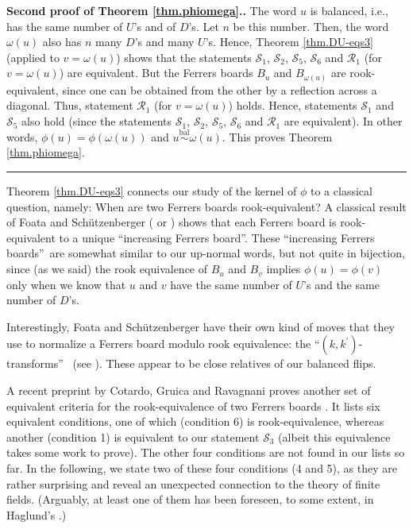 \documentclass[numbers=enddot,12pt,final,onecolumn,notitlepage]{scrartcl}%
\theoremstyle{definition}
\newenvironment{proof}[1][Proof]{\noindent\textbf{#1.} }{\ \rule{0.5em}{0.5em}}
\newcommand{\balsim}{\overset{\operatorname*{bal}}{\sim}}
\newenvironment{noncompile}{}{}
\begin{document}
\begin{noncompile}
\begin{proof}[Second proof of Theorem \ref{thm.phiomega}.]
The word $u$ is balanced, i.e., has the same number of $U$'s and of $D$'s. Let
$n$ be this number. Then, the word $\omega\left(  u\right)  $ also has $n$
many $D$'s and many $U$'s. Hence, Theorem \ref{thm.DU-eqs3} (applied to
$v=\omega\left(  u\right)  $) shows that the statements $\mathcal{S}_{1}$,
$\mathcal{S}_{2}$, $\mathcal{S}_{5}$, $\mathcal{S}_6$ and $\mathcal{R}_1$ (for $v=\omega
\left(  u\right)  $) are equivalent. But the Ferrers boards $B_{u}$ and
$B_{\omega\left(  u\right)  }$ are rook-equivalent, since one can be obtained
from the other by a reflection across a diagonal. Thus, statement
$\mathcal{R}_1$ (for $v=\omega\left(  u\right)  $) holds. Hence, statements
$\mathcal{S}_{1}$ and $\mathcal{S}_{5}$ also hold (since the statements
$\mathcal{S}_{1}$, $\mathcal{S}_{2}$, $\mathcal{S}_{5}$, $\mathcal{S}_6$ and $\mathcal{R}_1$
are equivalent). In other words, $\phi\left(  u\right)  =\phi\left(
\omega\left(  u\right)  \right)  $ and $u \balsim \omega\left(  u\right)  $. This proves Theorem \ref{thm.phiomega}.
\end{proof}
\end{noncompile}

Theorem \ref{thm.DU-eqs3} connects our study of the kernel of $\phi$ to a
classical question, namely: When are two Ferrers boards rook-equivalent? A
classical result of Foata and Sch\"{u}tzenberger (\cite[Theorem 6]{FoaSch70}
or \cite[Theorem 7]{BCHR11}) shows that each Ferrers board is rook-equivalent
to a unique \textquotedblleft increasing Ferrers board\textquotedblright.
These \textquotedblleft increasing Ferrers boards\textquotedblright\ are
somewhat similar to our up-normal words, but not quite in bijection, since (as
we said) the rook equivalence of $B_{u}$ and $B_{v}$ implies $\phi\left(
u\right)  =\phi\left(  v\right)  $ only when we know that $u$ and $v$ have the
same number of $U$'s and the same number of $D$'s.

Interestingly, Foata and Sch\"{u}tzenberger have their own kind of moves that
they use to normalize a Ferrers board modulo rook equivalence: the
\textquotedblleft$\left(  k,k^{\prime}\right)  $-transforms\textquotedblright%
\ (see \cite[Definition 8 bis on page 9]{FoaSch70}). These appear to be
close relatives of our balanced flips. \medskip

A recent preprint by Cotardo, Gruica and Ravagnani \cite{CoGrRa23} proves
another set of equivalent criteria for the rook-equivalence of two Ferrers
boards \cite[Corollary 3.2]{CoGrRa23}.
It lists six equivalent conditions, one of which (condition 6) is
rook-equivalence, whereas another (condition 1) is equivalent to our
statement $\mathcal{S}_3$ (albeit this equivalence takes some work to
prove).
The other four conditions are not found in our lists so far.
In the following, we  state two of these four conditions (4 and 5),
as they are rather surprising and reveal an unexpected connection to
the theory of finite fields. (Arguably, at least one of them has been
foreseen, to some extent, in Haglund's \cite{Haglun98}.)
\end{document}
